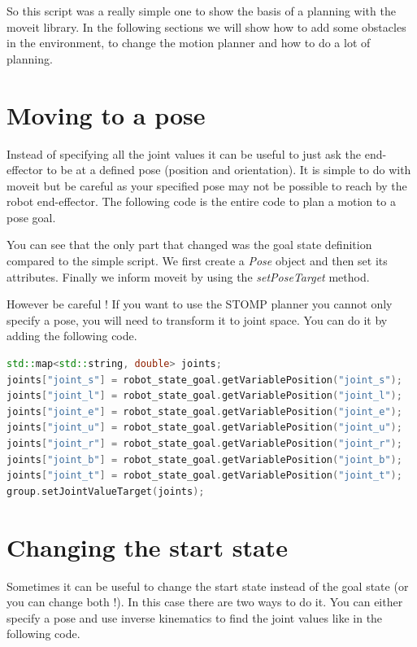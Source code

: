So this script was a really simple one to show the basis of a planning with the moveit library. In the following sections we will show how to add some obstacles in the environment, to change the motion planner and how to do a lot of planning.


\section{Moving to a pose}

Instead of specifying all the joint values it can be useful to just ask the end-effector to be at a defined pose (position and orientation). It is simple to do with moveit but be careful as your specified pose may not be possible to reach by the robot end-effector. The following code is the entire code to plan a motion to a pose goal.



You can see that the only part that changed was the goal state definition compared to the simple script. We first create a \emph{Pose} object and then set its attributes. Finally we inform moveit by using the \emph{setPoseTarget} method. 

However be careful ! If you want to use the STOMP planner you cannot only specify a pose, you will need to transform it to joint space. You can do it by adding the following code.

\begin{lstlisting}[language=c++]
std::map<std::string, double> joints;
joints["joint_s"] = robot_state_goal.getVariablePosition("joint_s");
joints["joint_l"] = robot_state_goal.getVariablePosition("joint_l");
joints["joint_e"] = robot_state_goal.getVariablePosition("joint_e");
joints["joint_u"] = robot_state_goal.getVariablePosition("joint_u");
joints["joint_r"] = robot_state_goal.getVariablePosition("joint_r");
joints["joint_b"] = robot_state_goal.getVariablePosition("joint_b");
joints["joint_t"] = robot_state_goal.getVariablePosition("joint_t");
group.setJointValueTarget(joints);
\end{lstlisting}

\section{Changing the start state}
Sometimes it can be useful to change the start state instead of the goal state (or you can change both !). In this case there are two ways to do it. You can either specify a pose and use inverse kinematics to find the joint values like in the following code.
 

